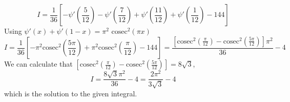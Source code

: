 \documentclass[12pt]{article}
\begin{document}
\[ I = \frac{1}{36} \left[   - \psi'\left( \frac{5}{12}\right) - \psi'\left(\frac{7}{12}\right)  +   \psi'\left(\frac{11}{12}\right) +  \psi'\left(\frac{1}{12}\right) - 144   \right] \]
Using $ \psi'(x)+\psi'(1-x) = \pi^2 \text{ cosec}^2(\pi x) $
\[ I = \frac{1}{36} \left[   -\pi^2 \text{cosec}^2\left(\frac{5 \pi}{12}\right)  + \pi^2 \text{cosec}^2\left( \frac{\pi}{12} \right) - 144   \right] = \frac{\left[  \text{cosec}^2\left(\frac{ \pi}{12} \right)  - \text{cosec}^2\left(\frac{5 \pi}{12} \right) \right] \pi^2}{36} - 4 \]
We can calculate that $\left[  \text{cosec}^2\left(\frac{ \pi}{12} \right)  - \text{cosec}^2\left(\frac{5 \pi}{12} \right) \right] = 8 \sqrt{3} $, 
\[ I = \frac{8 \sqrt{3} \pi^2}{36} - 4 = \frac{2\pi^2}{3 \sqrt{3}} - 4 \] 
which is the solution to the given integral. 
\end{document}
